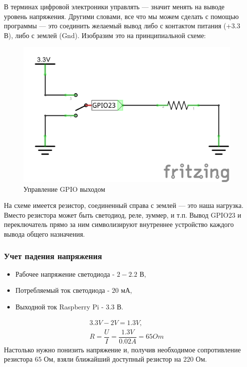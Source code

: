 \documentclass[a4paper,11pt]{article}
\begin{document}
\newpage
\noindent В терминах цифровой электроники управлять — значит менять на выводе уровень напряжения. Другими словами, все что мы можем сделать с помощью программы — это соединить желаемый вывод либо с контактом питания (+$3.3$ В), либо с землей (Gnd). Изобразим это на принципиальной схеме: \\
  
\begin{figure}[h!]
    \begin{center}
      \includegraphics[scale=0.7]{images/рис_11.png}
      \caption{Управление GPIO выходом}
    \end{center}
  \end{figure}

\noindent На схеме имеется резистор, соединенный справа с землей — это наша нагрузка. Вместо резистора может быть светодиод, реле, зуммер, и т.п. Вывод GPIO23 и переключатель прямо за ним символизируют внутреннее устройство каждого вывода общего назначения.

\subsubsection{Учет падения напряжения}
\begin{itemize}
  \item Рабочее напряжение светодиода - $2 - 2.2$ В,
  \item Потребляемый ток светодиода - $20$ мА,
  \item Выходной ток Raspberry Pi - $3.3$ В. 
\end{itemize}
\begin{gather}
  3.3 V - 2 V = 1.3 V, \\
  R = \dfrac{U}{I} = \dfrac{1.3 V}{0.02 A} = 65 Om
\end{gather}
\noindent Настолько нужно понизить напряжение и, получив необходимое сопротивление резистора $65$ Ом, взяли ближайший доступный резистор на $220$ Ом.
\end{document}
